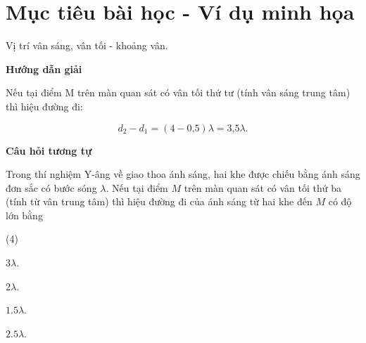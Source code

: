 \section{Mục tiêu bài học - Ví dụ minh họa}

\begin{dang}{Vị trí vân sáng, vân tối - khoảng vân.}

	{	\begin{center}
			\textbf{Hướng dẫn giải}
		\end{center}
		
		Nếu tại điểm M trên màn quan sát có vân tối thứ tư (tính vân sáng trung tâm) thì hiệu đường đi:
		
		\begin{equation*}
		d_2 - d_1 = (4-\text{0,5})\lambda = \text{3,5} \lambda.
		\end{equation*}
		
		
		\begin{center}
		\textbf{Câu hỏi tương tự}
		\end{center}

Trong thí nghiệm Y-âng về giao thoa ánh sáng, hai khe được chiếu bằng ánh sáng đơn sắc có bước sóng $ \lambda $. Nếu tại điểm $ M $ trên màn quan sát có vân tối thứ ba (tính từ vân trung tâm) thì hiệu đường đi của ánh sáng từ hai khe đến $ M $ có độ lớn bằng
\begin{mcq}(4)
	\item $ 3\lambda $.
	\item $ 2\lambda $.
	\item $ \num{1,5}\lambda $.
	\item $ \num{2,5}\lambda $.
\end{mcq}
	
}
\end{dang}
